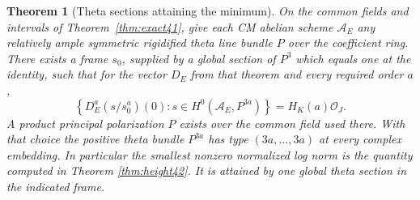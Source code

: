 \documentclass[a4paper,11pt]{article}
\newtheorem{theorem}[proposition]{Theorem}
\theoremstyle{definition}
\theoremstyle{remark}
\numberwithin{equation}{section}
\newcommand{\OO}{\mathcal O}
\begin{document}
\begin{theorem}[Theta sections attaining the minimum]\label{thm:globaltheta43}
On the common fields and intervals of Theorem~\ref{thm:exact41}, give each CM abelian scheme \(\mathcal A_E\) any relatively ample symmetric rigidified theta line bundle \(P\) over the coefficient ring. There exists a frame \(s_0\), supplied by a global section of \(P^3\) which equals one at the identity, such that for the vector \(D_E\) from that theorem and every required order \(a\),
\begin{equation}
 \left\{D_E^a(s/s_0^a)(0):s\in H^0(\mathcal A_E,P^{3a})\right\}
                      =H_K(a)\OO_J .                          \label{eq:theta43}
\end{equation}
A product principal polarization \(P\) exists over the common field used there. With that choice the positive theta bundle \(P^{3a}\) has type \((3a,\ldots,3a)\) at every complex embedding. In particular the smallest nonzero normalized log norm is the quantity computed in Theorem \ref{thm:height42}. It is attained by one global theta section in the indicated frame.
\end{theorem}
\end{document}
